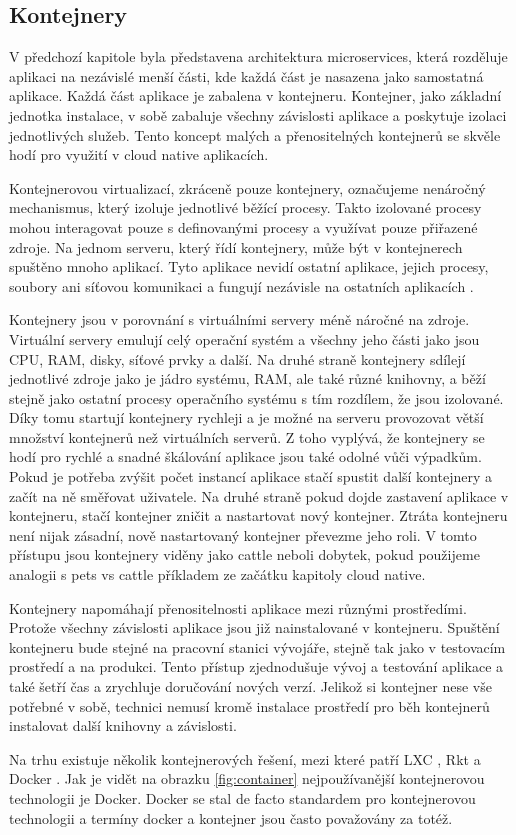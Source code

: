 \subsection{Kontejnery}
V předchozí kapitole byla představena architektura microservices, která rozděluje aplikaci na nezávislé menší části, kde každá část je nasazena jako samostatná aplikace. Každá část aplikace je zabalena v kontejneru. Kontejner, jako základní jednotka instalace, v sobě zabaluje všechny závislosti aplikace a poskytuje izolaci jednotlivých služeb. Tento koncept malých a přenositelných kontejnerů se skvěle hodí pro využití v cloud native aplikacích. \par
Kontejnerovou virtualizací, zkráceně pouze kontejnery, označujeme nenáročný \linebreak mechanismus, který izoluje jednotlivé běžící procesy. Takto izolované procesy mohou interagovat pouze s definovanými procesy a využívat pouze přiřazené zdroje. Na jednom serveru, který řídí kontejnery, může být v kontejnerech spuštěno mnoho aplikací. Tyto aplikace nevidí ostatní aplikace, jejich procesy, soubory ani síťovou komunikaci a fungují nezávisle na ostatních aplikacích \cite{docsopenshift}. \par
Kontejnery jsou v porovnání s virtuálními servery méně náročné na zdroje. Virtuální servery emulují celý operační systém a všechny jeho části jako jsou CPU, RAM, disky, síťové prvky a další. Na druhé straně kontejnery sdílejí jednotlivé zdroje jako je jádro systému, RAM, ale také různé knihovny, a běží stejně jako ostatní procesy operačního systému s tím rozdílem, že jsou izolované. Díky tomu startují kontejnery rychleji a je možné na serveru provozovat větší množství kontejnerů než virtuálních serverů. \linebreak Z toho vyplývá, že kontejnery se hodí pro rychlé a snadné škálování aplikace jsou také odolné vůči výpadkům. Pokud je potřeba zvýšit počet instancí aplikace stačí spustit další kontejnery a začít na ně směřovat uživatele. Na druhé straně pokud dojde zastavení aplikace v kontejneru, stačí kontejner zničit a nastartovat nový kontejner. Ztráta kontejneru není nijak zásadní, nově nastartovaný kontejner převezme jeho roli. V tomto přístupu jsou kontejnery viděny jako cattle neboli dobytek, pokud použijeme analogii s pets vs cattle příkladem ze začátku kapitoly cloud native. \par
Kontejnery napomáhají přenositelnosti aplikace mezi různými prostředími. Protože všechny závislosti aplikace jsou již nainstalované v kontejneru. Spuštění kontejneru bude stejné na pracovní stanici vývojáře, stejně tak jako v testovacím prostředí a na produkci. Tento přístup zjednodušuje vývoj a testování aplikace a také šetří čas a zrychluje doručování nových verzí. Jelikož si kontejner nese vše potřebné v sobě, technici nemusí kromě instalace prostředí pro běh kontejnerů instalovat další knihovny a závislosti. \par
Na trhu existuje několik kontejnerových řešení, mezi které patří LXC \cite{lxc},  Rkt\cite{rkt} a Docker \cite{docker}. Jak je vidět na obrazku \ref{fig:container} nejpoužívanější kontejnerovou technologii je Docker. Docker se stal de facto standardem pro kontejnerovou technologii a termíny docker a kontejner jsou často považovány za totéž. 

